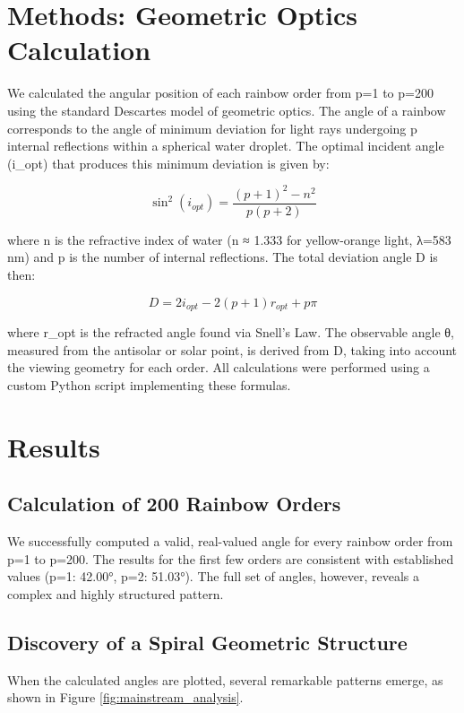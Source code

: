 \documentclass[12pt, twoside]{article}
\begin{document}
\section{Methods: Geometric Optics Calculation}
We calculated the angular position of each rainbow order from p=1 to p=200 using the standard Descartes model of geometric optics. The angle of a rainbow corresponds to the angle of minimum deviation for light rays undergoing p internal reflections within a spherical water droplet. The optimal incident angle (i_opt) that produces this minimum deviation is given by:

\begin{equation}
\sin^2(i_{opt}) = \frac{(p+1)^2 - n^2}{p(p+2)}
\end{equation}

where n is the refractive index of water (n ≈ 1.333 for yellow-orange light, λ=583 nm) and p is the number of internal reflections. The total deviation angle D is then:

\begin{equation}
D = 2i_{opt} - 2(p+1)r_{opt} + p\pi
\end{equation}

where r_opt is the refracted angle found via Snell's Law. The observable angle θ, measured from the antisolar or solar point, is derived from D, taking into account the viewing geometry for each order. All calculations were performed using a custom Python script implementing these formulas.

\section{Results}

\subsection{Calculation of 200 Rainbow Orders}
We successfully computed a valid, real-valued angle for every rainbow order from p=1 to p=200. The results for the first few orders are consistent with established values (p=1: 42.00°, p=2: 51.03°). The full set of angles, however, reveals a complex and highly structured pattern.

\subsection{Discovery of a Spiral Geometric Structure}
When the calculated angles are plotted, several remarkable patterns emerge, as shown in Figure \ref{fig:mainstream_analysis}.
\end{document}
